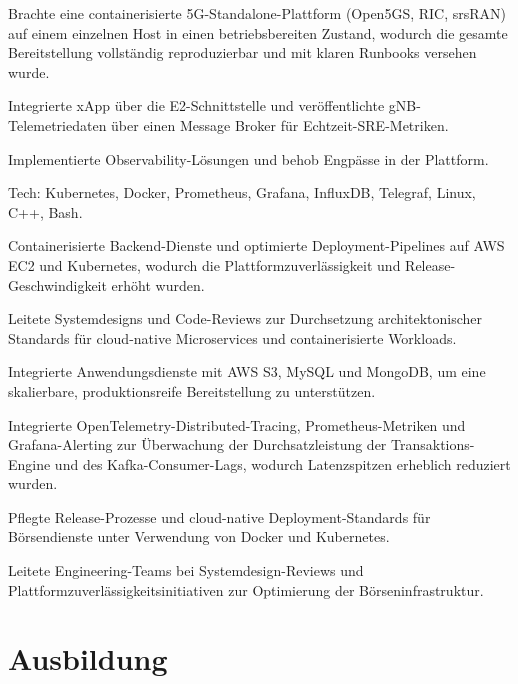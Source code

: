 \documentclass[10pt,a4paper]{resume}
\begin{document}
\bullets
  \item Brachte eine containerisierte 5G-Standalone-Plattform (Open5GS, RIC, srsRAN) auf einem einzelnen Host in einen betriebsbereiten Zustand, wodurch die gesamte Bereitstellung vollständig reproduzierbar und mit klaren Runbooks versehen wurde.
  \item Integrierte xApp über die E2-Schnittstelle und veröffentlichte gNB-Telemetriedaten über einen Message Broker für Echtzeit-SRE-Metriken.
  \item Implementierte Observability-Lösungen und behob Engpässe in der Plattform.
  \item Tech: Kubernetes, Docker, Prometheus, Grafana, InfluxDB, Telegraf, Linux, C++, Bash.
\bulletsend
\vspace{1.5pt}
\bullets
  \item Containerisierte Backend-Dienste und optimierte Deployment-Pipelines auf AWS EC2 und Kubernetes, wodurch die Plattformzuverlässigkeit und Release-Geschwindigkeit erhöht wurden.
  \item Leitete Systemdesigns und Code-Reviews zur Durchsetzung architektonischer Standards für cloud-native Microservices und containerisierte Workloads.
  \item Integrierte Anwendungsdienste mit AWS S3, MySQL und MongoDB, um eine skalierbare, produktionsreife Bereitstellung zu unterstützen.
\bulletsend
\vspace{1.5pt}
\bullets
  \item Integrierte OpenTelemetry-Distributed-Tracing, Prometheus-Metriken und Grafana-Alerting zur Überwachung der Durchsatzleistung der Transaktions-Engine und des Kafka-Consumer-Lags, wodurch Latenzspitzen erheblich reduziert wurden.
  \item Pflegte Release-Prozesse und cloud-native Deployment-Standards für Börsendienste unter Verwendung von Docker und Kubernetes.
  \item Leitete Engineering-Teams bei Systemdesign-Reviews und Plattformzuverlässigkeitsinitiativen zur Optimierung der Börseninfrastruktur.
\bulletsend
\vspace{1.5pt}

\section{Ausbildung}
\end{document}

